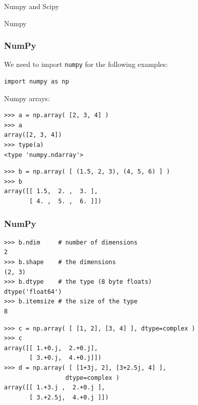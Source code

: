 \begin{frame}
\begin{center}
\Huge{Numpy and Scipy}
\end{center}
\end{frame}

\begin{frame}
\begin{center}
\Huge{Numpy}
\end{center}
\end{frame}

\begin{frame}[fragile]
    \frametitle{NumPy}
We need to import \verb#numpy# for the following examples:
    \begin{myColorBox}{0.9}{}
\begin{verbatim}
import numpy as np 
\end{verbatim}
    \end{myColorBox}
Numpy arrays:
    \begin{myColorBox}{0.9}{}
\begin{verbatim}
>>> a = np.array( [2, 3, 4] )
>>> a
array([2, 3, 4])
>>> type(a) 
<type 'numpy.ndarray'>
\end{verbatim}
    \end{myColorBox}
    \pause
    \begin{myColorBox}{0.9}{}
\begin{verbatim}
>>> b = np.array( [ (1.5, 2, 3), (4, 5, 6) ] )
>>> b
array([[ 1.5,  2. ,  3. ],
       [ 4. ,  5. ,  6. ]])
\end{verbatim}
    \end{myColorBox}
\end{frame}

\begin{frame}[fragile]
    \frametitle{NumPy}
    \begin{myColorBox}{0.9}{}
\begin{verbatim}
>>> b.ndim     # number of dimensions
2
>>> b.shape    # the dimensions
(2, 3)
>>> b.dtype    # the type (8 byte floats)
dtype('float64')
>>> b.itemsize # the size of the type
8
\end{verbatim}
    \end{myColorBox}
    \pause    
    \begin{myColorBox}{0.9}{}
\begin{verbatim}
>>> c = np.array( [ [1, 2], [3, 4] ], dtype=complex )
>>> c
array([[ 1.+0.j,  2.+0.j],
       [ 3.+0.j,  4.+0.j]])
>>> d = np.array( [ [1+3j, 2], [3+2.5j, 4] ],
				 dtype=complex )
array([[ 1.+3.j ,  2.+0.j ],
       [ 3.+2.5j,  4.+0.j ]])
\end{verbatim}
    \end{myColorBox}
\end{frame}

